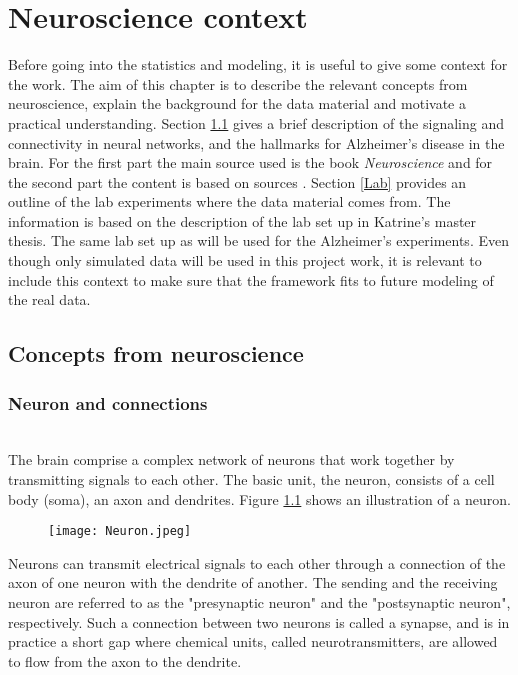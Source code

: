 
\chapter{Neuroscience context}

Before going into the statistics and modeling, it is useful to give some context for the work. The aim of this chapter is to describe the relevant concepts from neuroscience, explain the background for the data material and motivate a practical understanding. Section \ref{structure_nn} gives a brief description of the signaling and connectivity in neural networks, and the hallmarks for Alzheimer's disease in the brain. For the first part the main source used is the book \textit{Neuroscience} \cite{Purves} and for the second part the content is based on sources \cite{Gomez,Witter:2011, Alz}. Section \ref{Lab} provides an outline of the lab experiments where the data material comes from. The information is based on the description of the lab set up in Katrine's master thesis. The same lab set up as will be used for the Alzheimer's experiments. Even though only simulated data will be used in this project work, it is relevant to include this context to make sure that the framework fits to future modeling of the real data. 



\section{Concepts from neuroscience}
\label{structure_nn}

\subsection{Neuron and connections}\\
The brain comprise a complex network of neurons that work together by transmitting signals to each other. The basic unit, the neuron, 
 consists of a cell body (soma), an axon and dendrites. Figure \ref{neuron} shows an illustration of a neuron.
\begin{figure}[h]
    \caption{}
    \label{neuron}
    \centering
    \texttt{[image: Neuron.jpeg]}
\end{figure} 

Neurons can transmit electrical signals to each other through a connection of the axon of one neuron with the dendrite of another. The sending and the receiving neuron are referred to as the "presynaptic neuron" and the "postsynaptic neuron", respectively. Such a connection between two neurons is called a synapse, and is in practice a short gap where chemical units, called neurotransmitters, are allowed to flow from the axon to the dendrite. 

